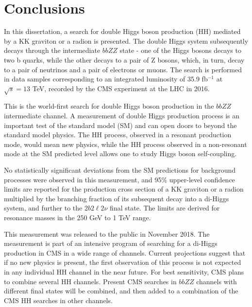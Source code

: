 \chapter{Conclusions}
\label{ch:Conclusions}

In this dissertation, a search for double Higgs boson production (HH) mediated by a KK graviton or a radion is presented. The double Higgs system subsequently decays through the intermediate $bbZZ$ state - one of the Higgs bosons decays to two b quarks, while the other decays to a pair of Z bosons, which, in turn, decay to a pair of neutrinos and a pair of electrons or muons. The search is performed in data samples corresponding to an integrated luminosity of 35.9 fb$^{-1}$ at $\sqrt s =13$ TeV, recorded by the CMS experiment at the LHC in 2016. 

This is the world-first search for double Higgs boson production in the $bbZZ$ intermediate channel. A measurement of double Higgs production process is an important test of the standard model (SM) and can open doors to beyond the standard model physics. The HH process, observed in a resonant production mode, would mean new physics, while the HH process observed in a non-resonant mode at the SM predicted level allows one to study Higgs boson self-coupling. 

No statistically significant deviations from the SM predictions for background processes were observed in this measurement, and 95\% upper-level confidence limits are reported for the production cross section of a KK graviton or a radion multiplied by the branching fraction of its subsequent decay into a di-Higgs system, and further to the $2 b 2 \ell 2 \nu$ final state. The limits are derived for resonance masses in the 250 GeV to 1 TeV range.

This measurement was released to the public in November 2018. The measurement is part of an intensive program of searching for a di-Higgs production in CMS in a wide range of channels. Current projections suggest that if no new physics is present, the first observation of this process is not expected in any individual HH channel in the near future. For best sensitivity, CMS plans to combine several HH channels. Present CMS searches in $bbZZ$ channels with different final states will be combined, and then added to a combination of the CMS HH searches in other channels.
